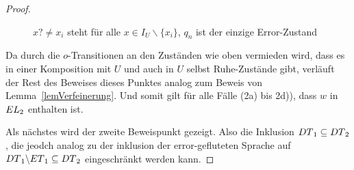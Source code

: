 \begin{proof}
\begin{itemize}
\begin{figure} [h!tbp]
\begin{center}
        \caption{$x?\neq x_i$ steht für alle $x\in I_U\backslash\{x_i\}$, $q_n$
          ist der einzige Error-Zustand}
\label{UmitEundO}
      \end{center}
      \end{figure}
      Da durch die $o$-Transitionen an den Zuständen wie oben vermieden wird,
      dass es in einer Komposition mit $U$ und auch in $U$ selbst Ruhe-Zustände
      gibt, verläuft der Rest des Beweises dieses Punktes analog zum Beweis von
      Lemma~\ref{lemVerfeinerung}. Und somit gilt für alle Fälle (2a) bis 2d)),
      dass $w$ in $EL{}_2$ enthalten ist. %
  \end{itemize}

  Als nächstes wird der zweite Beweispunkt gezeigt. Also die Inklusion
  $DT{}_1\subseteq DT{}_2$, die jeodch analog zu der inklusion der
  error-gefluteten Sprache auf $DT{}_1\backslash ET{}_1 \subseteq DT{}_2$
  eingeschränkt werden kann. %


\end{proof}
